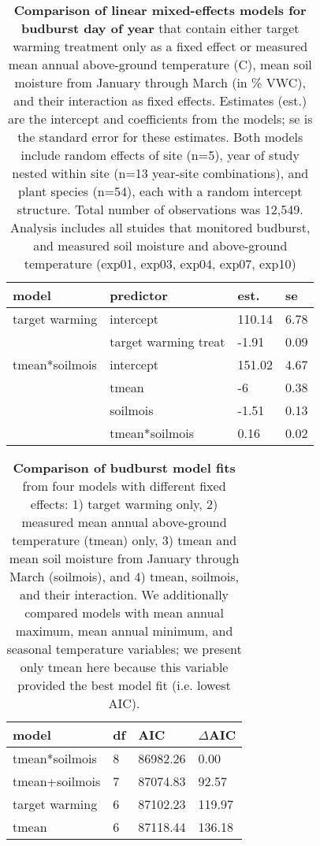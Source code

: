 \documentclass{article}
\begin{document}
\begin{table}[ht]
\centering
\caption{\textbf{Comparison of linear mixed-effects models for budburst day of year} that contain either target warming treatment only as a fixed effect or measured mean annual above-ground temperature (\degree C), mean soil moisture from January through March (in \% VWC), and their interaction as fixed effects. Estimates (est.) are the intercept and coefficients from the models; se is the standard error for these estimates. Both models include random effects of site (n=5), year of study nested within site (n=13 year-site combinations), and plant species (n=54), each with a random intercept structure. Total number of observations was 12,549. Analysis includes all stuides that monitored budburst, and measured soil moisture and above-ground temperature (exp01, exp03, exp04, exp07, exp10)} 
\label{table:bbmods}
\begingroup\footnotesize
\begin{tabular}{|p{}|p{}|p{}|p{}|}
  \hline
model & predictor & est. & se \\ 
  \hline
target warming & intercept & 110.14 & 6.78 \\ 
   & target warming treat & -1.91 & 0.09 \\ 
   \hline
tmean*soilmois & intercept & 151.02 & 4.67 \\ 
   & tmean & -6 & 0.38 \\ 
   & soilmois & -1.51 & 0.13 \\ 
   & tmean*soilmois & 0.16 & 0.02 \\ 
   \hline
\end{tabular}
\endgroup
\end{table}
\begin{table}[ht]
\centering
\caption{\textbf{Comparison of budburst model fits} from four models with different fixed effects: 1) target warming only, 2) measured mean annual above-ground temperature (tmean) only, 3) tmean and mean soil moisture from January through March (soilmois), and 4) tmean, soilmois, and their interaction. We additionally compared models with mean annual maximum, mean annual minimum, and seasonal temperature variables; we present only tmean here because this variable provided the best model fit (i.e. lowest AIC).} 
\label{table:bbaic}
\begingroup\footnotesize
\begin{tabular}{|p{}|p{}|p{}|p{}|}
  \hline
model & df & AIC & $\Delta$AIC \\ 
  \hline
tmean*soilmois & 8 & 86982.26 & 0.00 \\ 
  tmean+soilmois & 7 & 87074.83 & 92.57 \\ 
  target warming & 6 & 87102.23 & 119.97 \\ 
  tmean & 6 & 87118.44 & 136.18 \\ 
   \hline
\end{tabular}
\endgroup
\end{table}\clearpage
\clearpage
\end{document}
